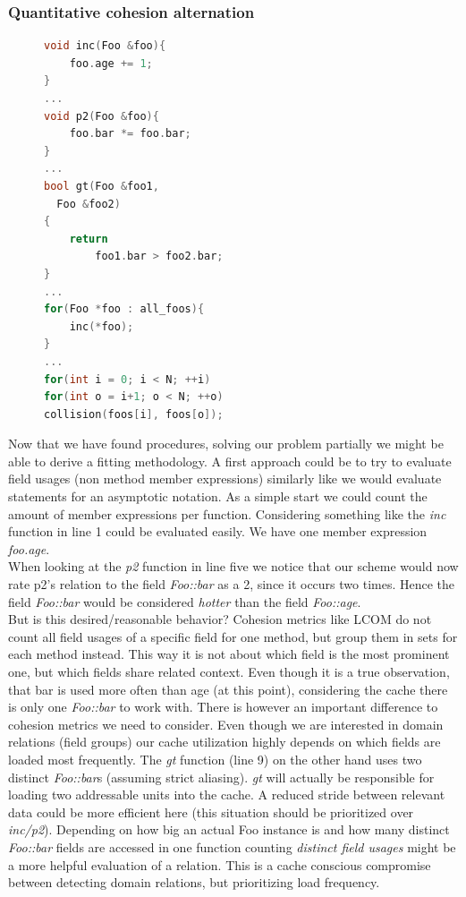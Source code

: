 \subsubsection{Quantitative cohesion alternation}
\begin{figure}
\begin{lstlisting}[language=C++, name={Exemplary pseudo-ish code}, label={exem_code}]
void inc(Foo &foo){
	foo.age += 1;
}
...
void p2(Foo &foo){
	foo.bar *= foo.bar;
}
...
bool gt(Foo &foo1,
  Foo &foo2)
{
	return
		foo1.bar > foo2.bar;
}
...
for(Foo *foo : all_foos){
	inc(*foo);
}
...
for(int i = 0; i < N; ++i)
for(int o = i+1; o < N; ++o)
collision(foos[i], foos[o]);
\end{lstlisting}
\end{figure}
Now that we have found procedures, solving our problem partially we might be able to derive a fitting methodology. A first approach could be to try to evaluate field usages (non method member expressions) similarly like we would evaluate statements for an asymptotic notation. As a simple start we could count the amount of member expressions per function. Considering something like  the \textit{inc} function in line 1 could be evaluated easily. We have one member expression \textit{foo.age}.\\
When looking at the \textit{p2} function in line five we notice that our scheme would now rate p2's relation to the field \textit{Foo::bar} as a 2, since it occurs two times. Hence the field \textit{Foo::bar} would be considered \textit{hotter} than the field \textit{Foo::age}.\\
But is this desired/reasonable behavior? Cohesion metrics like LCOM do not count all field usages of a specific field for one method, but group them in sets for each method instead. This way it is not about which field is the most prominent one, but which fields share related context. Even though it is a true observation, that bar is used more often than age (at this point), considering the cache there is only one \textit{Foo::bar} to work with. There is however an important difference to cohesion metrics we need to consider. Even though we are interested in domain relations (field groups) our cache utilization highly depends on which fields are loaded most frequently. The \textit{gt} function (line 9) on the other hand uses two distinct \textit{Foo::bar}s (assuming strict aliasing). \textit{gt} will actually be responsible for loading two addressable units into the cache. A reduced stride between relevant data could be more efficient here (this situation should be prioritized over \textit{inc/p2}). Depending on how big an actual Foo instance is and how many distinct \textit{Foo::bar} fields are accessed in one function counting \textit{distinct field usages} might be a more helpful evaluation of a relation. This is a cache conscious compromise between detecting domain relations, but prioritizing load frequency.\\\\
